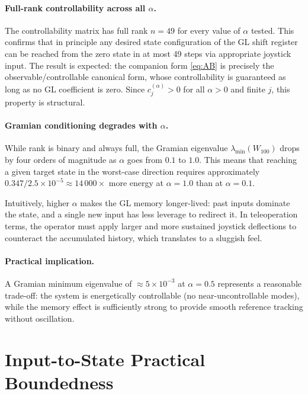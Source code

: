 \documentclass[11pt,a4paper]{article}
\theoremstyle{definition}
\begin{document}
\paragraph{Full-rank controllability across all $\alpha$.}
The controllability matrix has full rank $n = 49$ for every value of $\alpha$
tested.  This confirms that in principle any desired state configuration of
the GL shift register can be reached from the zero state in at most 49 steps
via appropriate joystick input.  The result is expected: the companion form
\eqref{eq:AB} is precisely the observable/controllable canonical form, whose
controllability is guaranteed as long as no GL coefficient is zero.  Since
$c_j^{(\alpha)} > 0$ for all $\alpha > 0$ and finite $j$, this property is
structural.

\paragraph{Gramian conditioning degrades with $\alpha$.}
While rank is binary and always full, the Gramian eigenvalue
$\lambda_{\min}(W_{100})$ drops by four orders of magnitude as $\alpha$ goes
from $0.1$ to $1.0$.  This means that reaching a given target state in the
worst-case direction requires approximately $0.347/2.5\times10^{-5} \approx
14\,000 \times$ more energy at $\alpha = 1.0$ than at $\alpha = 0.1$.

Intuitively, higher $\alpha$ makes the GL memory longer-lived: past inputs
dominate the state, and a single new input has less leverage to redirect it.
In teleoperation terms, the operator must apply larger and more sustained
joystick deflections to counteract the accumulated history, which translates
to a sluggish feel.

\paragraph{Practical implication.}
A Gramian minimum eigenvalue of $\approx 5 \times 10^{-3}$ at $\alpha = 0.5$
represents a reasonable trade-off: the system is energetically controllable
(no near-uncontrollable modes), while the memory effect is sufficiently strong
to provide smooth reference tracking without oscillation.

\section{Input-to-State Practical Boundedness}
\label{sec:iss}
\end{document}
